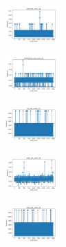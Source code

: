 \begin{figure}[H]
    \begin{subfigure}
        \centering
        \includegraphics[width=0.234\textwidth]{img/aggsf/rand_set_const_10_277451237_time.png}
    \end{subfigure}
    \hfill
    \begin{subfigure}
        \centering
        \includegraphics[width=0.234\textwidth]{img/aggsf/newthyroid_set_const_10_277451237_time.png}
    \end{subfigure}
    \hfill
    \begin{subfigure}
        \centering
        \includegraphics[width=0.234\textwidth]{img/aggsf/iris_set_const_10_49258669_time.png}
    \end{subfigure}
    \hfill
    \begin{subfigure}
        \centering
        \includegraphics[width=0.234\textwidth]{img/aggsf/ecoli_set_const_10_49258669_time.png}
    \end{subfigure}
    \hfill
    \begin{subfigure}
        \centering
        \includegraphics[width=0.234\textwidth]{img/aggsf/rand_set_const_10_49258669_time.png}
    \end{subfigure}
    \hfill
    \begin{subfigure}
        \centering

\end{subfigure}
\end{figure}
